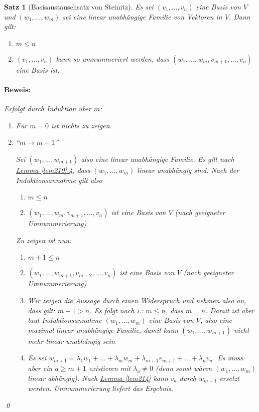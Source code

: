 \documentclass{report}
\newcommand{\IN}[1]{\index{#1|BH}}
\newcommand{\lb}{\lambda}
\theoremstyle{customrem}
\theoremstyle{customdef}
\newtheorem{satz}[definition]{Satz}
\renewenvironment{proof}{\paragraph{Beweis: }}{\qed}
\theoremstyle{customenv}
\begin{document}
	\begin{satz}[Basisaustauschsatz von Steinitz]
		\IN{Basisaustauschsatz}
		\label{satz215}
		Es sei \((v_1, \dots, v_n)\) eine Basis von \(V\) und \((w_1, \dots, w_m)\) sei eine linear unabhängige Familie von Vektoren in \(V\). Dann gilt:
		\begin{enumerate}
			\itemsep0cm
			\item \(m \leq n\)
			\item \((v_1, \dots, v_n)\) kann so umnummeriert werden, dass \((w_1, \ldots, w_m, v_{m + 1}, \ldots, v_n)\) eine Basis ist.
		\end{enumerate}

		\begin{proof} Erfolgt durch Induktion über \(m\):
			\begin{enumerate}
				\item[IA:] Für \(m = 0\) ist nichts zu zeigen.
				\item[IS:] "`\(m \to m + 1\)"'

				Sei \((w_1, \dots, w_{m+1})\) also eine linear unabhängige Familie. Es gilt nach \hyperref[lem210]{Lemma \ref*{lem210}.4}, dass \((w_1, \dots, w_m)\) linear unabhängig sind. Nach der Induktionsannahme gilt also

				\begin{enumerate}
					\item[i.]  \(m \leq n\)
					\item[ii.] \((w_1, \dots, w_m, v_{m+1}, \dots, v_n)\) ist eine Basis von \(V\) (nach geeigneter Umnummerierung)
				\end{enumerate}

				Zu zeigen ist nun:

				\begin{enumerate}
					\item[a) ] \(m+1\leq n\)
					\item[b) ] \((w_1, \dots, w_{m+1}, v_{m+2}, \dots, v_n)\) ist eine Basis von \(V\) (nach geeigneter Umnummerierung)\vspace{.2cm}
					\item[Zu a):] Wir zeigen die Aussage durch einen Widerspruch und nehmen also an, dass gilt: \(m+1>n\). Es folgt nach i.: \(m\leq n\), dass \(m=n\). Damit ist aber laut Induktionsannahme \((w_1,\ldots, w_m)\) eine Basis von \(V\), also eine maximal linear unabhängige Familie, damit kann \((w_1, \ldots, w_{m+1})\) nicht mehr linear unabhängig sein \Lightning
					\item[Zu b):] Es sei \(w_{m+1} = \lb_1w_1+\ldots+\lb_m w_m + \lb_{m+1} v_{m+1} +\ldots + \lb_n v_n\). Es muss aber ein \(a\geq m+1\) existieren mit \(\lb_a\not=0\) (denn sonst wären \((w_1, \ldots, w_m)\) linear abhängig). Nach \hyperref[lem214]{Lemma \ref*{lem214}} kann \(v_a\) durch \(w_{m+1}\) ersetzt werden. Umnummerierung liefert das Ergebnis.
				\end{enumerate}
			\end{enumerate}
		\end{proof}
	\end{satz}
\end{document}
